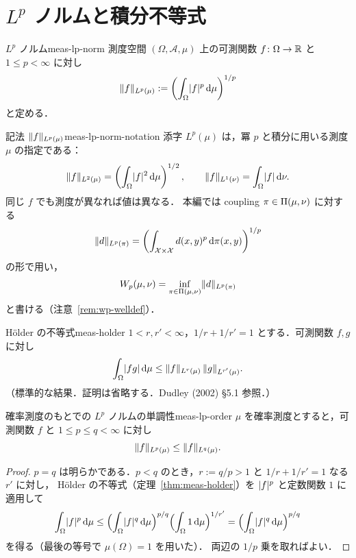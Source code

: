 \section{$L^p$ ノルムと積分不等式}

\begin{definition}{$L^p$ ノルム}{meas-lp-norm}
  測度空間 $(\Omega,\mathcal{A},\mu)$ 上の可測関数 $f\colon\Omega\to\mathbb{R}$ と
  $1\leq p<\infty$ に対し
  \[
    \lVert f \rVert_{L^p(\mu)}
    :=
    \left(\int_\Omega\lvert f \rvert^p\,\mathrm{d}\mu\right)^{1/p}
  \]
  と定める．
\end{definition}

\begin{remark}{記法 $\lVert f \rVert_{L^p(\mu)}$}{meas-lp-norm-notation}
  添字 $L^p(\mu)$ は，冪 $p$ と積分に用いる測度 $\mu$ の指定である：
  \[
    \lVert f \rVert_{L^2(\mu)}=\left(\int_\Omega\lvert f \rvert^2\,\mathrm{d}\mu\right)^{1/2},
    \qquad
    \lVert f \rVert_{L^1(\nu)}=\int_\Omega\lvert f \rvert\,\mathrm{d}\nu .
  \]
  同じ $f$ でも測度が異なれば値は異なる．
  本編では coupling $\pi\in\Pi(\mu,\nu)$ に対する
  \[
    \lVert d \rVert_{L^p(\pi)}
    =\left(\int_{\mathcal{X}\times \mathcal{X}}d(x,y)^p\,\mathrm{d}\pi(x,y)\right)^{1/p}
  \]
  の形で用い，
  \[
    W_p(\mu,\nu)=\inf_{\pi\in\Pi(\mu,\nu)}\lVert d \rVert_{L^p(\pi)}
  \]
  と書ける（注意~\ref{rem:wp-welldef}）．
\end{remark}

\begin{theorem}{Hölder の不等式}{meas-holder}
  $1<r,r'<\infty$，$1/r+1/r'=1$ とする．可測関数 $f,g$ に対し
  \[
    \int_\Omega\lvert fg \rvert\,\mathrm{d}\mu
    \leq
    \lVert f \rVert_{L^r(\mu)}\,\lVert g \rVert_{L^{r'}(\mu)}.
  \]
  （標準的な結果．証明は省略する．Dudley (2002) §5.1 参照．）
\end{theorem}

\begin{claim}{確率測度のもとでの $L^p$ ノルムの単調性}{meas-lp-order}
  $\mu$ を確率測度とすると，可測関数 $f$ と
  $1\leq p\leq q<\infty$ に対し
  \[
    \lVert f \rVert_{L^p(\mu)}\leq\lVert f \rVert_{L^q(\mu)}.
  \]
\end{claim}

\begin{proof}
  $p=q$ は明らかである．$p<q$ のとき，$r:=q/p>1$ と
  $1/r+1/r'=1$ なる $r'$ に対し，
  Hölder の不等式（定理~\ref{thm:meas-holder}）を
  $\lvert f \rvert^p$ と定数関数 $1$ に適用して
  \[
    \int_\Omega\lvert f \rvert^p\,\mathrm{d}\mu
    \leq
    \Bigl(\int_\Omega\lvert f \rvert^{q}\,\mathrm{d}\mu\Bigr)^{p/q}
    \Bigl(\int_\Omega1\,\mathrm{d}\mu\Bigr)^{1/r'}
    =
    \Bigl(\int_\Omega\lvert f \rvert^q\,\mathrm{d}\mu\Bigr)^{p/q}
  \]
  を得る（最後の等号で $\mu(\Omega)=1$ を用いた）．
  両辺の $1/p$ 乗を取ればよい．
\end{proof}

